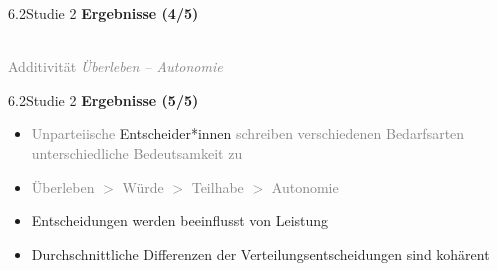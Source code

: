\documentclass[xcolor=table,9pt,aspectratio=169]{beamer}
\begin{document}
\begin{frame}{\vspace*{10mm}6.2\hspace*{1em}Studie 2}
\textbf{Ergebnisse (4/5)}\\
\medskip
\begin{center}
   \\
   \textcolor{gray}{Additivität \textit{Überleben -- Autonomie}}
\end{center}

\end{frame}


\begin{frame}{\vspace*{10mm}6.2\hspace*{1em}Studie 2}
\textbf{Ergebnisse (5/5)}\\
\medskip
\begin{itemize}
   \item \textcolor{gray}{Unparteiische} Entscheider*innen \textcolor{gray}{schreiben verschiedenen Bedarfsarten unterschiedliche Bedeutsamkeit zu}
   \item \textcolor{gray}{Überleben $>$ Würde $>$ Teilhabe $>$ Autonomie}
   \item Entscheidungen werden beeinflusst von Leistung
   \item Durchschnittliche Differenzen der Verteilungsentscheidungen sind kohärent
\end{itemize}
\end{frame}
\end{document}
